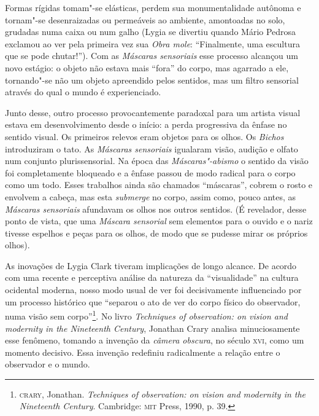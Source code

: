 \begin{multicols}{2}
\vspace{\baselineskip}
{\small{}}
\vspace{\baselineskip}

Formas rígidas tomam"-se elásticas,
perdem sua monumentalidade autônoma e tornam"-se desenraizadas ou
permeáveis ao ambiente, amontoadas no solo, grudadas numa caixa ou num
galho (Lygia se divertiu quando Mário Pedrosa exclamou ao ver pela
primeira vez sua \textit{Obra mole}: ``Finalmente, uma escultura que se
pode chutar!''). Com as \textit{Máscaras sensoriais} esse processo
alcançou um novo estágio: o objeto não estava mais ``fora'' do corpo,
mas agarrado a ele, tornando"-se não um objeto apreendido pelos sentidos,
mas um filtro sensorial através do qual o mundo é experienciado.

Junto desse, outro processo provocantemente paradoxal para um artista
visual estava em desenvolvimento desde o início: a perda progressiva da
ênfase no sentido visual. Os primeiros relevos eram objetos para os
olhos. Os \textit{Bichos} introduziram o tato. As \textit{Máscaras
sensoriais} igualaram visão, audição e olfato num conjunto
plurissensorial. Na época das \textit{Máscaras"-abismo} o sentido da visão
foi completamente bloqueado e a ênfase passou de modo radical para o
corpo como um todo. Esses trabalhos ainda são chamados ``máscaras'',
cobrem o rosto e envolvem a cabeça, mas esta \textit{submerge} no corpo,
assim como, pouco antes, as \textit{Máscaras sensoriais} afundavam os
olhos nos outros sentidos. (É revelador, desse ponto de vista, que uma
\textit{Máscara sensorial} sem elementos para o ouvido e o nariz tivesse
espelhos e peças para os olhos, de modo que se pudesse mirar os próprios
olhos).

As inovações de Lygia Clark tiveram implicações de longo alcance. De
acordo com uma recente e perceptiva análise da natureza da
``visualidade'' na cultura ocidental moderna, nosso modo usual de ver
foi decisivamente influenciado por um processo histórico que ``separou o
ato de ver do corpo físico do observador, numa visão sem
corpo''\footnote{\textsc{crary}, Jonathan. \textit{Techniques of observation: on
vision and modernity in the Nineteenth Century}. Cambridge: \textsc{mit} Press,
  1990, p. 39.}. No livro \textit{Techniques of observation: on vision and modernity in the Nineteenth Century}, Jonathan Crary analisa
minuciosamente esse fenômeno, tomando a invenção da \textit{câmera
obscura}, no século \textsc{xvi}, como um momento decisivo. Essa invenção
redefiniu radicalmente a relação entre o observador e o mundo. 


\end{multicols}
